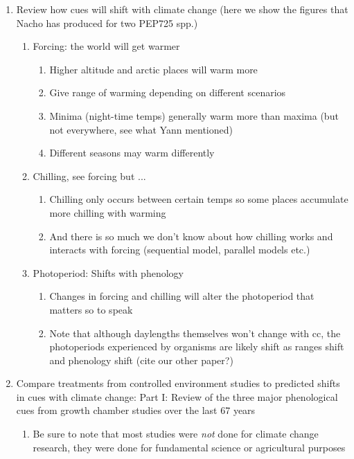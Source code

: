 \documentclass[11pt,letterpaper]{article}
\begin{document}
\begin{enumerate}
\begin{enumerate}
\end{enumerate}
\item Review how cues will shift with climate change (here we show the figures that Nacho has produced for two PEP725 spp.)
\begin{enumerate}
\item Forcing: the world will get warmer %
\begin{enumerate}
\item Higher altitude and arctic places will warm more
\item Give range of warming depending on different scenarios
\item Minima (night-time temps) generally warm more than maxima (but not everywhere, see what Yann mentioned)
\item Different seasons may warm differently
\end{enumerate}
\item Chilling, see forcing but ... 
\begin{enumerate}
\item Chilling only occurs between certain temps so some places accumulate more chilling with warming
\item And there is so much we don't know about how chilling works and interacts with forcing (sequential model, parallel models etc.)
\end{enumerate}
\item Photoperiod: Shifts with phenology
\begin{enumerate}
\item Changes in forcing and chilling will alter the photoperiod that matters so to speak
\item Note that although daylengths themselves won't change with cc, the photoperiods experienced by organisms are likely shift as ranges shift and phenology shift (cite our other paper?)
\end{enumerate}
\end{enumerate}
\item Compare treatments from controlled environment studies to predicted shifts in cues with climate change: Part I: Review of the three major phenological cues from growth chamber studies over the last 67 years %
\begin{enumerate}
\item Be sure to note that most studies were \emph{not} done for climate change research, they were done for fundamental science or agricultural purposes 

\end{enumerate}
\end{enumerate}
\end{document}

